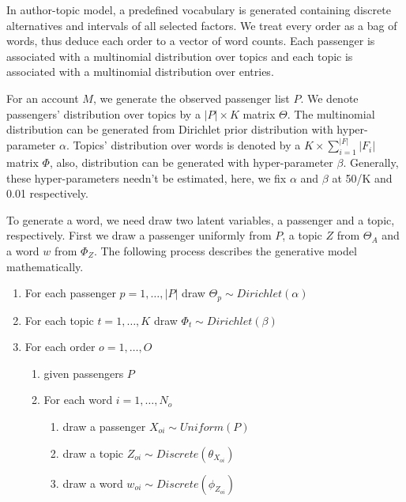 \documentclass{llncs}
\begin{document}
In author-topic model\cite{deiv:corpora}, a predefined vocabulary is generated containing discrete alternatives and intervals of all selected factors. We treat every order as a bag of words, thus deduce each order to a vector of word counts. Each passenger is associated with a multinomial distribution over topics and each topic is associated with a multinomial distribution over entries.\par

For an account $M$, we generate the observed passenger list $P$. We denote passengers' distribution over topics by a $|P| \times K$ matrix $\Theta$. The multinomial distribution can be generated from Dirichlet prior distribution with hyper-parameter $\alpha$. Topics' distribution over words is denoted by a $K \times \sum_{i=1}^{|F|}|F_i| $  matrix $\Phi$, also, distribution can be generated with hyper-parameter $\beta$. Generally, these hyper-parameters needn't be estimated, here, we fix $\alpha$ and $\beta$ at 50/K and 0.01 respectively. \par

To generate a word, we need draw two latent variables,  a passenger and a topic, respectively. First we draw a passenger uniformly from $P$,  a topic $Z$ from $\Theta_A$ and a word $w$ from $\Phi_Z$. The following process describes the generative model mathematically.\par

\begin{enumerate}
\item For each passenger $p=1,\dots,|P|$ draw $\Theta_p \sim Dirichlet(\alpha)$
\item For each topic $t=1,\dots,K$ draw $\Phi_t \sim Dirichlet(\beta)$
\item For each order $o=1,\dots,O$
       \begin{enumerate}[fullwidth,itemindent=1em,label=(\alph*)]
       \item given passengers $P$
       \item For each word $i=1,\dots, N_o$
              \begin{enumerate}[fullwidth,itemindent=2em,label=(\roman*)]
              \item draw a passenger $X_{oi} \sim Uniform(P)$
              \item draw a topic $Z_{oi} \sim Discrete(\theta_{X_{oi}})$
              \item draw a word $w_{oi} \sim Discrete(\phi_{Z_{oi}})$
              \end{enumerate}
       \end{enumerate}
\end{enumerate}
\end{document}
